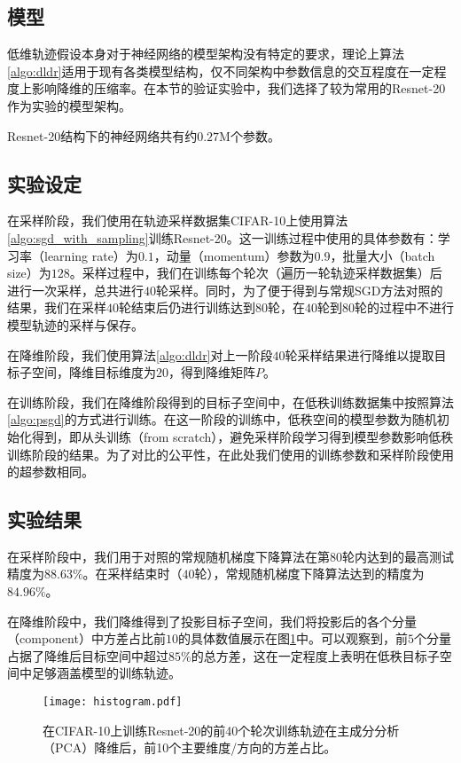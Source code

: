 \subsection{模型}

低维轨迹假设本身对于神经网络的模型架构没有特定的要求，理论上算法\ref{algo:dldr}适用于现有各类模型结构，仅不同架构中参数信息的交互程度在一定程度上影响降维的压缩率。在本节的验证实验中，我们选择了较为常用的Resnet-20\cite{he2016deep}作为实验的模型架构。

Resnet-20结构下的神经网络共有约$0.27$M个参数。


\subsection{实验设定}

在采样阶段，我们使用在轨迹采样数据集CIFAR-10上使用算法\ref{algo:sgd_with_sampling}训练Resnet-20。这一训练过程中使用的具体参数有：学习率（learning rate）为$0.1$，动量（momentum）参数为$0.9$，批量大小（batch size）为$128$。采样过程中，我们在训练每个轮次（遍历一轮轨迹采样数据集）后进行一次采样，总共进行$40$轮采样。同时，为了便于得到与常规SGD方法对照的结果，我们在采样$40$轮结束后仍进行训练达到$80$轮，在$40$轮到$80$轮的过程中不进行模型轨迹的采样与保存。

在降维阶段，我们使用算法\ref{algo:dldr}对上一阶段$40$轮采样结果进行降维以提取目标子空间，降维目标维度为$20$，得到降维矩阵$P$。

在训练阶段，我们在降维阶段得到的目标子空间中，在低秩训练数据集中按照算法\ref{algo:psgd}的方式进行训练。在这一阶段的训练中，低秩空间的模型参数为随机初始化得到，即从头训练（from scratch），避免采样阶段学习得到模型参数影响低秩训练阶段的结果。为了对比的公平性，在此处我们使用的训练参数和采样阶段使用的超参数相同。

\subsection{实验结果}

在采样阶段中，我们用于对照的常规随机梯度下降算法在第$80$轮内达到的最高测试精度为$88.63\%$。在采样结束时（$40$轮），常规随机梯度下降算法达到的精度为$84.96\%$。

在降维阶段中，我们降维得到了投影目标子空间，我们将投影后的各个分量（component）中方差占比前$10$的具体数值展示在图\ref{fig:dldr:pca_ratio}中。可以观察到，前$5$个分量占据了降维后目标空间中超过$85\%$的总方差，这在一定程度上表明在低秩目标子空间中足够涵盖模型的训练轨迹。
\begin{figure}[!htp]
    \centering
    \texttt{[image: histogram.pdf]}
    \caption[主成分分析方差占比]
      {在CIFAR-10上训练Resnet-20的前40个轮次训练轨迹在主成分分析（PCA）降维后，前10个主要维度/方向的方差占比。}
   \label{fig:dldr:pca_ratio}
  \end{figure}
  


